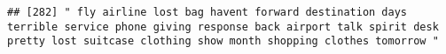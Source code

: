 \documentclass[
]{article}
\begin{document}
\begin{verbatim}
## [282] " fly airline lost bag havent forward destination days terrible service phone giving response back airport talk spirit desk pretty lost suitcase clothing show month shopping clothes tomorrow "                                                                                                                                                                                                                                                                                                                                                                                                                                                                                                                                                                                                                                                                                                                                                                                                                                                                                                                                                                                                                                                                                                                                                                                                                                                                                                                                                                                                                                                                                                                                                                                                

\end{verbatim}
\end{document}
